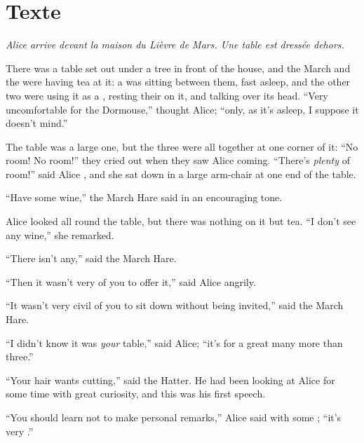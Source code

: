 \documentclass[troisieme]{fiche}
\begin{document}
\newpage
\section{Texte}

\noindent\small\textit{Alice arrive devant la maison du Lièvre de Mars. Une table est dressée
dehors.}\normalsize

\begin{texte}
There was a table set out under a tree in front of the house, and the March
 and the  were having tea at
it: a  was sitting between them, fast asleep, and the other
two were using it as a , resting their
 on it, and talking over its head. ``Very uncomfortable for the
Dormouse,'' thought Alice; ``only, as it's asleep, I suppose it doesn't mind.''

The table was a large one, but the three were all  together
at one corner of it: ``No room! No room!'' they cried out when they saw Alice coming.
``There's \emph{plenty} of room!'' said Alice ,
and she sat down in a large arm-chair at one end of the table.

``Have some wine,'' the March Hare said in an encouraging tone.

Alice looked all round the table, but there was nothing on it but tea. ``I don't see any
wine,'' she remarked.

``There isn't any,'' said the March Hare.

``Then it wasn't very  of you to offer it,'' said Alice
angrily.

``It wasn't very civil of you to sit down without being invited,'' said the March Hare.

``I didn't know it was \emph{your} table,'' said Alice; ``it's  for a great many more than three.''

``Your hair wants cutting,'' said the Hatter. He had been looking at Alice for some time with
great curiosity, and this was his first speech.

``You should learn not to make personal remarks,'' Alice said with some
; ``it's very .''


\end{texte}
\end{document}
